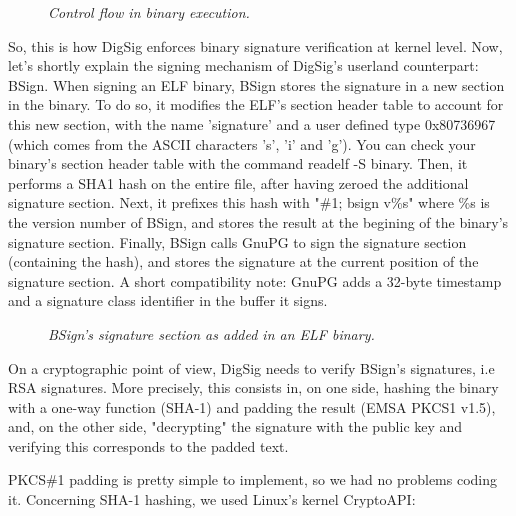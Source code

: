\documentclass{article}
\begin{document}

\begin{figure}[htb]
\begin{center}
\epsfxsize=12cm 
\caption{{\it Control flow in binary execution. }}
\label{fig1}
\end{center}
\end{figure}

So, this is how DigSig enforces binary signature verification at
kernel level. Now, let's shortly explain the signing mechanism of
DigSig's userland counterpart: BSign. When signing an ELF binary,
BSign stores the signature in a new section in the binary.  To do so,
it modifies the ELF's section header table to account for this new
section, with the name 'signature' and a user defined type 0x80736967
(which comes from the ASCII characters 's', 'i' and 'g'). You can
check your binary's section header table with the command readelf -S
binary.  Then, it performs a SHA1 hash on the entire file, after
having zeroed the additional signature section.  Next, it prefixes
this hash with "\#1; bsign v\%s" where \%s is the version number of
BSign, and stores the result at the begining of the binary's signature
section. Finally, BSign calls GnuPG to sign the signature section
(containing the hash), and stores the signature at the current position
of the signature section. A short compatibility note: GnuPG adds a
32-byte timestamp and a signature class identifier in the
buffer it signs.

\begin{figure}[htb]
\begin{center}
\epsfxsize=12cm 
\caption{{\it BSign's signature section as added in an ELF binary. }}
\label{fig2}
\end{center}
\end{figure}


On a cryptographic point of view, DigSig needs to verify 
BSign's signatures, i.e RSA signatures. More precisely, this 
consists in, on one side, hashing the binary
with a one-way function (SHA-1) and padding the result (EMSA PKCS1 v1.5), and,
on the other side, "decrypting" the signature with the public key
and verifying this corresponds to the padded text.

PKCS\#1 padding is pretty simple to implement, so we had no problems
coding it. Concerning SHA-1 hashing, we used Linux's kernel CryptoAPI:
\end{document}
